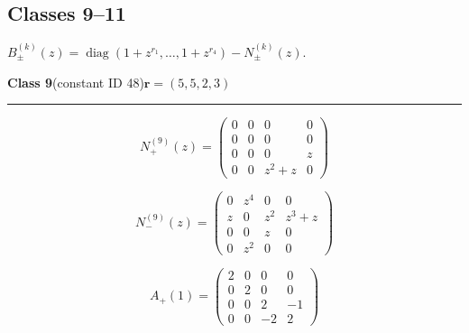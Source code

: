 \subsection*{Classes 9--11}
\noindent $B_\pm^{(k)}(z)=\operatorname{diag}(1+z^{r_1},\ldots,1+z^{r_4})-N_\pm^{(k)}(z)$.\par\medskip
\noindent\begin{minipage}{\linewidth}
\noindent\textbf{Class 9}\quad\small (constant ID 48)\hfill $\symbf{r}=(5,5,2,3)$
\par\smallskip\noindent\textcolor{rulegray}{\rule{\linewidth}{0.3pt}}
\begin{minipage}[c]{0.495\linewidth}\centering\fontsize{9.7}{12}\selectfont
\setlength{\abovedisplayskip}{4pt}\setlength{\belowdisplayskip}{4pt}
\setlength{\abovedisplayshortskip}{4pt}\setlength{\belowdisplayshortskip}{4pt}
\setlength{\arraycolsep}{3pt}\renewcommand{\arraystretch}{1.08}
\[N_{+}^{(9)}(z)=\begin{pmatrix}0 & 0 & 0 & 0\\0 & 0 & 0 & 0\\0 & 0 & 0 & z\\0 & 0 & z^{2} + z & 0\end{pmatrix}\]
\end{minipage}%
\begin{minipage}[c]{0.495\linewidth}\centering\fontsize{9.7}{12}\selectfont
\setlength{\abovedisplayskip}{4pt}\setlength{\belowdisplayskip}{4pt}
\setlength{\abovedisplayshortskip}{4pt}\setlength{\belowdisplayshortskip}{4pt}
\setlength{\arraycolsep}{3pt}\renewcommand{\arraystretch}{1.08}
\[N_{-}^{(9)}(z)=\begin{pmatrix}0 & z^{4} & 0 & 0\\z & 0 & z^{2} & z^{3} + z\\0 & 0 & z & 0\\0 & z^{2} & 0 & 0\end{pmatrix}\]
\end{minipage}%
\par\noindent
\begin{minipage}[c]{0.495\linewidth}\centering\fontsize{9.7}{12}\selectfont
\setlength{\abovedisplayskip}{4pt}\setlength{\belowdisplayskip}{4pt}
\setlength{\abovedisplayshortskip}{4pt}\setlength{\belowdisplayshortskip}{4pt}
\setlength{\arraycolsep}{3pt}\renewcommand{\arraystretch}{1.08}
\[A_{+}(1)=\begin{pmatrix}2 & 0 & 0 & 0\\0 & 2 & 0 & 0\\0 & 0 & 2 & -1\\0 & 0 & -2 & 2\end{pmatrix}\]

\end{minipage}
\end{minipage}
